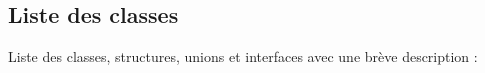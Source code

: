 \subsection{Liste des classes}
Liste des classes, structures, unions et interfaces avec une brève description \+:\begin{DoxyCompactList}
\item{}
\end{DoxyCompactList}
